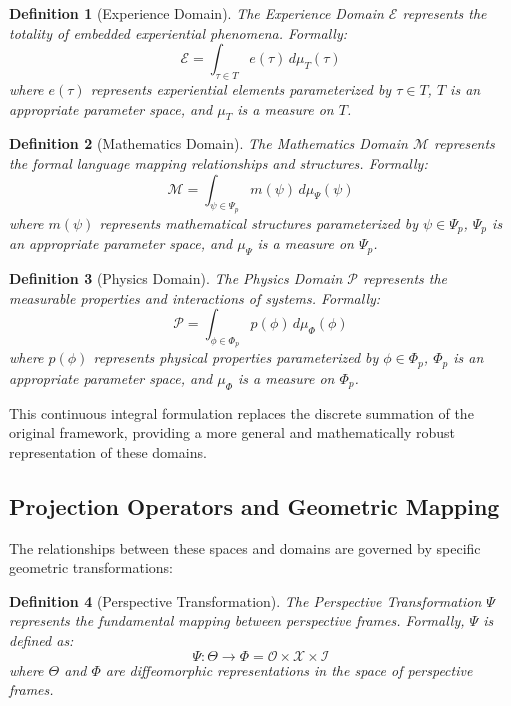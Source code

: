 \documentclass{article}
\newtheorem{definition}{Definition}
\begin{document}
\begin{definition}[Experience Domain]
The Experience Domain $\mathcal{E}$ represents the totality of embedded experiential phenomena. Formally:
\begin{equation}
\mathcal{E} = \int_{\tau \in T} e(\tau) \, d\mu_T(\tau)
\end{equation}
where $e(\tau)$ represents experiential elements parameterized by $\tau \in T$, $T$ is an appropriate parameter space, and $\mu_T$ is a measure on $T$.
\end{definition}

\begin{definition}[Mathematics Domain]
The Mathematics Domain $\mathcal{M}$ represents the formal language mapping relationships and structures. Formally:
\begin{equation}
\mathcal{M} = \int_{\psi \in \Psi_p} m(\psi) \, d\mu_\Psi(\psi)
\end{equation}
where $m(\psi)$ represents mathematical structures parameterized by $\psi \in \Psi_p$, $\Psi_p$ is an appropriate parameter space, and $\mu_\Psi$ is a measure on $\Psi_p$.
\end{definition}

\begin{definition}[Physics Domain]
The Physics Domain $\mathcal{P}$ represents the measurable properties and interactions of systems. Formally:
\begin{equation}
\mathcal{P} = \int_{\phi \in \Phi_p} p(\phi) \, d\mu_\Phi(\phi)
\end{equation}
where $p(\phi)$ represents physical properties parameterized by $\phi \in \Phi_p$, $\Phi_p$ is an appropriate parameter space, and $\mu_\Phi$ is a measure on $\Phi_p$.
\end{definition}

This continuous integral formulation replaces the discrete summation of the original framework, providing a more general and mathematically robust representation of these domains.

\subsection{Projection Operators and Geometric Mapping}

The relationships between these spaces and domains are governed by specific geometric transformations:

\begin{definition}[Perspective Transformation]
The Perspective Transformation $\Psi$ represents the fundamental mapping between perspective frames. Formally, $\Psi$ is defined as:
\begin{equation}
\Psi: \Theta \to \Phi = \mathcal{O} \times \mathcal{X} \times \mathcal{I}
\end{equation}
where $\Theta$ and $\Phi$ are diffeomorphic representations in the space of perspective frames.
\end{definition}
\end{document}

